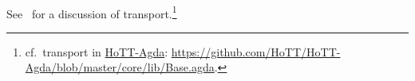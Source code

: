 \begin{code}
\>[1]\AgdaSpace{}%
\AgdaSymbol{:}\AgdaSpace{}%
\AgdaSymbol{\{}\AgdaSpace{}%
\AgdaSymbol{:}\AgdaSpace{}%
\AgdaSpace{}%
\AgdaSpace{}%
\AgdaSymbol{\}}\AgdaSpace{}%
\AgdaSymbol{(}\AgdaSpace{}%
\AgdaSymbol{:}\AgdaSpace{}%
\AgdaSpace{}%
\AgdaSpace{}%
\AgdaSpace{}%
\AgdaSpace{}%
\AgdaSymbol{)}\AgdaSpace{}%
\AgdaSymbol{\{}\AgdaSpace{}%
\AgdaSpace{}%
\AgdaSymbol{:}\AgdaSpace{}%
\AgdaSymbol{\}}\AgdaSpace{}%
\AgdaSpace{}%
\AgdaSpace{}%
\AgdaSpace{}%
\AgdaSpace{}%
\AgdaSpace{}%
\AgdaSpace{}%
\AgdaSpace{}%
\AgdaSpace{}%
\AgdaSpace{}%
\<%
\\
%
\>[1]\AgdaSpace{}%
\AgdaSpace{}%
\AgdaSymbol{(}\AgdaSpace{}%
\AgdaSymbol{\{}\AgdaSpace{}%
\AgdaSymbol{=}\AgdaSpace{}%
\AgdaSymbol{\})}\AgdaSpace{}%
\AgdaSymbol{=}\AgdaSpace{}%
\AgdaSpace{}%
\AgdaSymbol{(}\AgdaSpace{}%
\AgdaSymbol{)}\<%
\end{code}
\ccpad
See~\cite{MHE} for a discussion of transport.\footnote{cf.~transport in \href{https://github.com/HoTT/HoTT-Agda/blob/master/core/lib/Base.agda}{HoTT-Agda}: \url{https://github.com/HoTT/HoTT-Agda/blob/master/core/lib/Base.agda}.}

